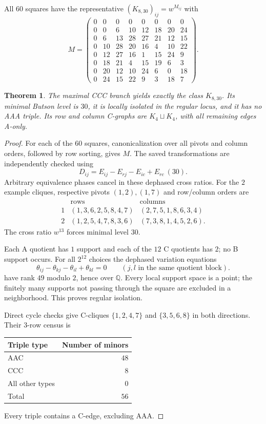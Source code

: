 \documentclass[11pt,a4paper]{article}
\newtheorem{theorem}{Theorem}[section]
\theoremstyle{plain}
\theoremstyle{definition}
\numberwithin{equation}{section}
\begin{document}
\label{sec:CCCcorrected}
All $60$ squares have the representative $(K_{8,30})_{ij}=w^{M_{ij}}$ with
$$
M=\begin{pmatrix}
0&0&0&0&0&0&0&0\\
0&0&6&10&12&18&20&24\\
0&6&13&28&27&21&12&15\\
0&10&28&20&16&4&10&22\\
0&12&27&16&1&15&24&9\\
0&18&21&4&15&19&6&3\\
0&20&12&10&24&6&0&18\\
0&24&15&22&9&3&18&7
\end{pmatrix}.
$$
\begin{theorem}\label{thm:CCCone}\label{thm:isolation}
The maximal CCC branch yields exactly the class $K_{8,30}$. Its minimal Butson level is $30$, it is locally isolated in the regular locus, and it has no AAA triple. Its row and column C-graphs are $K_4\sqcup K_4$, with all remaining edges A-only.
\end{theorem}
\begin{proof}
For each of the $60$ squares, canonicalization over all pivots and column orders, followed by row sorting, gives $M$. The saved transformations are independently checked using
$$D_{ij}=E_{ij}-E_{rj}-E_{ic}+E_{rc}\ (30).$$
Arbitrary equivalence phases cancel in these dephased cross ratios. For the $2$ example cliques, respective pivots $(1,2),(1,7)$ and row/column orders are
$$\begin{array}{c|l|l}
&\text{rows}&\text{columns}\\\hline
1&(1,3,6,2,5,8,4,7)&(2,7,5,1,8,6,3,4)\\
2&(1,2,5,4,7,8,3,6)&(7,3,8,1,4,5,2,6).
\end{array}$$
The cross ratio $w^{13}$ forces minimal level $30$.

Each A quotient has $1$ support and each of the $12$ C quotients has $2$; no B support occurs. For all $2^{12}$ choices the dephased variation equations
$$
\theta_{ij}-\theta_{kj}-\theta_{il}+\theta_{kl}=0
\qquad(j,l\text{ in the same quotient block}).
$$
have rank $49$ modulo $2$, hence over $\mathbb Q$. Every local support space is a point; the finitely many supports not passing through the square are excluded in a neighborhood. This proves regular isolation.

Direct cycle checks give C-cliques $\{1,2,4,7\}$ and $\{3,5,6,8\}$ in both directions. Their $3$-row census is
\begin{center}\begin{tabular}{lr}\toprule
Triple type&Number of minors\\\midrule
AAC&$48$\\
CCC&$8$\\
All other types&$0$\\\midrule
Total&$56$\\\bottomrule
\end{tabular}\end{center}
Every triple contains a C-edge, excluding AAA.
\end{proof}
\end{document}
